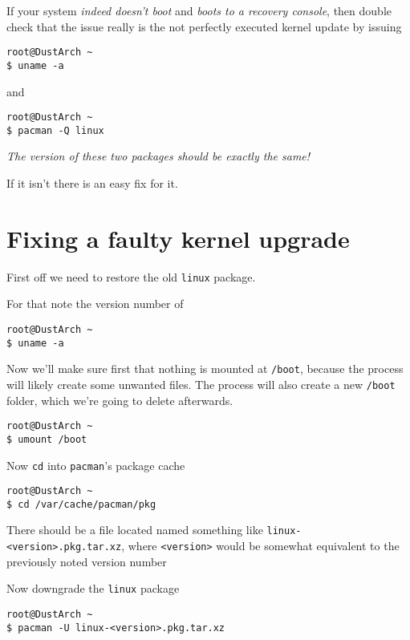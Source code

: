 \documentclass[10pt]{dustdoc}
\begin{document}
If your system \emph{indeed doesn’t boot} and \emph{boots to a recovery console}, then double check that the issue really is the not perfectly executed kernel update by issuing

\begin{verbatim}
root@DustArch ~
$ uname -a
\end{verbatim}

\noindent
and

\begin{verbatim}
root@DustArch ~
$ pacman -Q linux
\end{verbatim}

\emph{The version of these two packages should be exactly the same!}

If it isn’t there is an easy fix for it.

\section{Fixing a faulty kernel upgrade}
\label{sec:fixing-a-faulty-kernel-upgrade}

First off we need to restore the old \texttt{linux} package.

For that note the version number of

\begin{verbatim}
root@DustArch ~
$ uname -a
\end{verbatim}

Now we’ll make sure first that nothing is mounted at \texttt{/boot}, because the process will likely create some unwanted files.
The process will also create a new \texttt{/boot} folder, which we’re going to delete afterwards.

\begin{verbatim}
root@DustArch ~
$ umount /boot
\end{verbatim}

Now \texttt{cd} into \texttt{pacman}'s package cache

\begin{verbatim}
root@DustArch ~
$ cd /var/cache/pacman/pkg
\end{verbatim}

There should be a file located named something like \texttt{linux-<version>.pkg.tar.xz}, where \texttt{<version>} would be somewhat equivalent to the previously noted version number

Now downgrade the \texttt{linux} package

\begin{verbatim}
root@DustArch ~
$ pacman -U linux-<version>.pkg.tar.xz
\end{verbatim}
\end{document}
